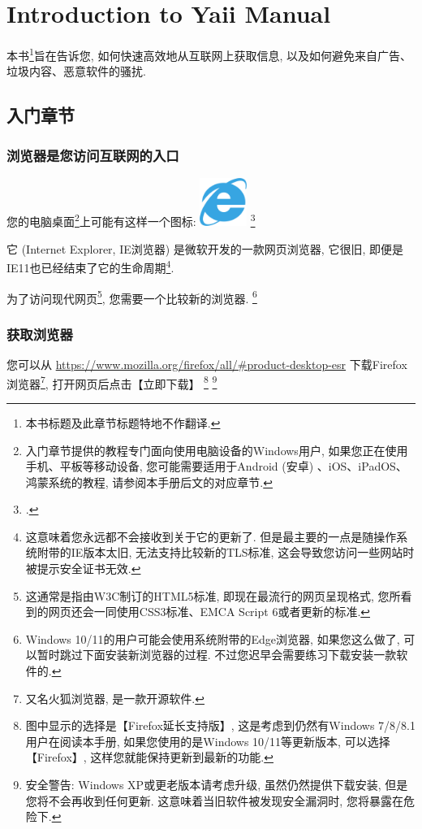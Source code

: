 \chapter{Introduction to Yaii Manual}

本书\footnote{本书标题及此章节标题特地不作翻译. }旨在告诉您, 如何快速高效地从互联网上获取信息, 以及如何避免来自广告、垃圾内容、恶意软件的骚扰. 

\section{入门章节}

\subsection{浏览器是您访问互联网的入口}

您的电脑桌面\footnote{入门章节提供的教程专门面向使用电脑设备的Windows用户, 如果您正在使用手机、平板等移动设备, 您可能需要适用于Android (安卓) 、iOS、iPadOS、鸿蒙系统的教程, 请参阅本手册后文的对应章节. }上可能有这样一个图标: 
\includegraphics[width=0.6in]{media/Internet_Explorer_4_and_5_logo.png}
\footcite[该Internet Explorer标志来源于 \url{https://commons.wikimedia.org/wiki/File:Internet_Explorer_4_and_5_logo.svg}, Credit by Microsoft, Public domain, via Wikimedia Commons]{IE}

它 (Internet
Explorer, IE浏览器) 是微软开发的一款网页浏览器, 它很旧, 即便是IE11也已经结束了它的生命周期\footnote{这意味着您永远都不会接收到关于它的更新了. 但是最主要的一点是随操作系统附带的IE版本太旧, 无法支持比较新的TLS标准, 这会导致您访问一些网站时被提示安全证书无效. }. 

为了访问现代网页\footnote{这通常是指由W3C制订的HTML5标准, 即现在最流行的网页呈现格式, 您所看到的网页还会一同使用CSS3标准、EMCA Script 6或者更新的标准. }, 您需要一个比较新的浏览器. \footnote{Windows 10/11的用户可能会使用系统附带的Edge浏览器, 如果您这么做了, 可以暂时跳过下面安装新浏览器的过程. 不过您迟早会需要练习下载安装一款软件的. }

\subsection{获取浏览器}

您可以从 \url{https://www.mozilla.org/firefox/all/\#product-desktop-esr} 下载Firefox浏览器\footnote{又名火狐浏览器, 是一款开源软件. }, 打开网页后点击【立即下载】
\footnote{图中显示的选择是【Firefox延长支持版】, 这是考虑到仍然有Windows
7/8/8.1用户在阅读本手册, 如果您使用的是Windows
10/11等更新版本, 可以选择【Firefox】, 这样您就能保持更新到最新的功能. }
\footnote{安全警告: Windows XP或更老版本请考虑升级, 虽然仍然提供下载安装, 但是您将不会再收到任何更新. 这意味着当旧软件被发现安全漏洞时, 您将暴露在危险下. }

